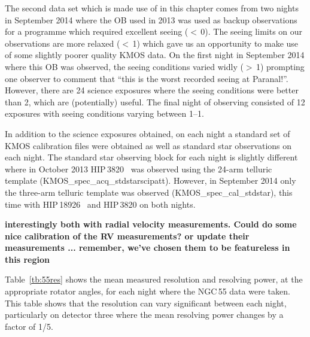 The second data set which is made use of in this chapter comes from two nights in September 2014 where the OB used in 2013 was used as backup observations for a programme which required excellent seeing ($<$\,0).
The seeing limits on our observations are more relaxed ($<$\,1) which gave us an opportunity to make use of some slightly poorer quality KMOS data.
On the first night in September 2014 where this OB was observed, the seeing conditions varied widly ($>$\,1) prompting one observer to comment that ``this is the worst recorded seeing at Paranal!''.
However, there are 24 science exposures where the seeing conditions were better than 2, which are (potentially) useful.
The final night of observing consisted of 12 exposures with seeing conditions varying between 1--1.

In addition to the science exposures obtained, on each night a standard set of KMOS calibration files were obtained as well as standard star observations on each night.
The standard star observing block for each night is slightly different where in October 2013 HIP\,3820~\citep[B8\,V;][]{1978mcts.book.....H} was observed using the 24-arm telluric template (KMOS\_spec\_acq\_stdstarscipatt).
However, in September 2014 only the three-arm telluric template was observed (KMOS\_spec\_cal\_stdstar), this time with HIP\,18926~\citep[B3\,V;][]{1988mcts.book.....H} and HIP\,3820 on both nights.

\textbf{interestingly both with radial velocity measurements. Could do some nice calibration of the RV measurements? or update their measurements ... remember, we've chosen them to be featureless in this region}

Table~\ref{tb:55res} shows the mean measured resolution and resolving power, at the appropriate rotator angles, for each night where the NGC\,55 data were taken.
This table shows that the resolution can vary significant between each night, particularly on detector three where the mean resolving power changes by a factor of 1/5.

